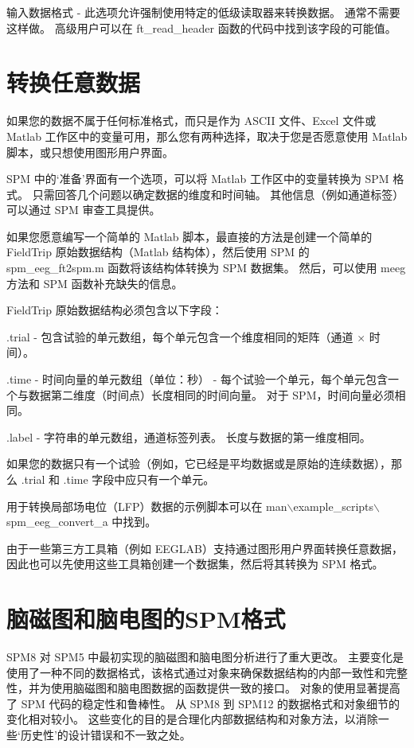 输入数据格式 - 此选项允许强制使用特定的低级读取器来转换数据。
通常不需要这样做。
高级用户可以在 ft\_read\_header 函数的代码中找到该字段的可能值。


\section{转换任意数据}

如果您的数据不属于任何标准格式，而只是作为 ASCII 文件、Excel 文件或 Matlab 工作区中的变量可用，那么您有两种选择，取决于您是否愿意使用 Matlab 脚本，或只想使用图形用户界面。

SPM 中的‘准备’界面有一个选项，可以将 Matlab 工作区中的变量转换为 SPM 格式。
只需回答几个问题以确定数据的维度和时间轴。
其他信息（例如通道标签）可以通过 SPM 审查工具提供。

如果您愿意编写一个简单的 Matlab 脚本，最直接的方法是创建一个简单的 FieldTrip 原始数据结构（Matlab 结构体），然后使用 SPM 的 spm\_eeg\_ft2spm.m 函数将该结构体转换为 SPM 数据集。
然后，可以使用 meeg 方法和 SPM 函数补充缺失的信息。

FieldTrip 原始数据结构必须包含以下字段：

.trial - 包含试验的单元数组，每个单元包含一个维度相同的矩阵（通道 × 时间）。

.time - 时间向量的单元数组（单位：秒） - 每个试验一个单元，每个单元包含一个与数据第二维度（时间点）长度相同的时间向量。
对于 SPM，时间向量必须相同。

.label - 字符串的单元数组，通道标签列表。
长度与数据的第一维度相同。


如果您的数据只有一个试验（例如，它已经是平均数据或是原始的连续数据），那么 .trial 和 .time 字段中应只有一个单元。

用于转换局部场电位（LFP）数据的示例脚本可以在 man$\backslash$example\_scripts$\backslash$spm\_eeg\_convert\_a 中找到。

由于一些第三方工具箱（例如 EEGLAB）支持通过图形用户界面转换任意数据，因此也可以先使用这些工具箱创建一个数据集，然后将其转换为 SPM 格式。


\section{脑磁图和脑电图的SPM格式}


SPM8 对 SPM5 中最初实现的脑磁图和脑电图分析进行了重大更改。
主要变化是使用了一种不同的数据格式，该格式通过对象来确保数据结构的内部一致性和完整性，并为使用脑磁图和脑电图数据的函数提供一致的接口。
对象的使用显著提高了 SPM 代码的稳定性和鲁棒性。
从 SPM8 到 SPM12 的数据格式和对象细节的变化相对较小。
这些变化的目的是合理化内部数据结构和对象方法，以消除一些‘历史性’的设计错误和不一致之处。

